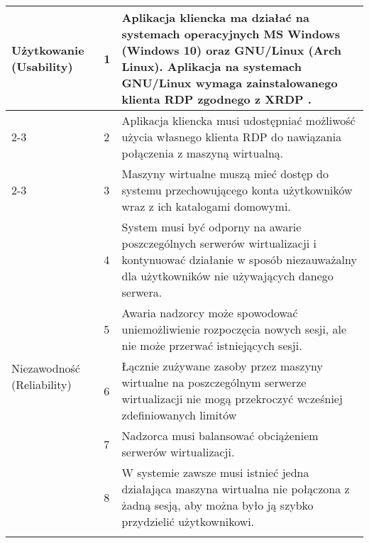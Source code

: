 \documentclass[../wstep.tex]{subfiles}
\begin{document}
\begin{longtable}{|p{}|p{}|p{}|}
    \multirow[t]{11}{=}{Użytkowanie (Usability)}    & 1            & Aplikacja kliencka ma działać na systemach operacyjnych MS Windows (Windows 10) oraz GNU/Linux (Arch Linux). Aplikacja na systemach GNU/Linux wymaga zainstalowanego klienta RDP zgodnego z XRDP \parencite{xrdp-clients}. \\ \cline{2-3}
                                                    & 2            & Aplikacja kliencka musi udostępniać możliwość użycia własnego klienta RDP do nawiązania połączenia z maszyną wirtualną.                                                                                                     \\ \cline{2-3}
                                                    & 3            & Maszyny wirtualne muszą mieć dostęp do systemu przechowującego konta użytkowników wraz z ich katalogami domowymi.                                                                                                           \\ \hline
    \multirow[t]{7}{=}{Niezawodność (Reliability)}  & 4            & System musi być odporny na awarie poszczególnych serwerów wirtualizacji i kontynuować działanie w sposób niezauważalny dla użytkowników nie używających danego serwera.                                                    \\ \cline{2-3}
                                                    & 5            & Awaria nadzorcy może spowodować uniemożliwienie rozpoczęcia nowych sesji, ale nie może przerwać istniejących sesji.                                                                                                         \\ \hline
    \multirow[t]{11}{=}{Wydajność (Performance)}    & 6            & Łącznie zużywane zasoby przez maszyny wirtualne na poszczególnym serwerze wirtualizacji nie mogą przekroczyć wcześniej zdefiniowanych limitów                                                                              \\ \cline{2-3}
                                                    & 7            & Nadzorca musi balansować obciążeniem serwerów wirtualizacji.                                                                                                                                                                 \\ \cline{2-3}
                                                    & 8            & W systemie zawsze musi istnieć jedna działająca maszyna wirtualna nie połączona z żadną sesją, aby można było ją szybko przydzielić użytkownikowi.                                                                         \\ \cline{2-3}

\end{longtable}
\end{document}

